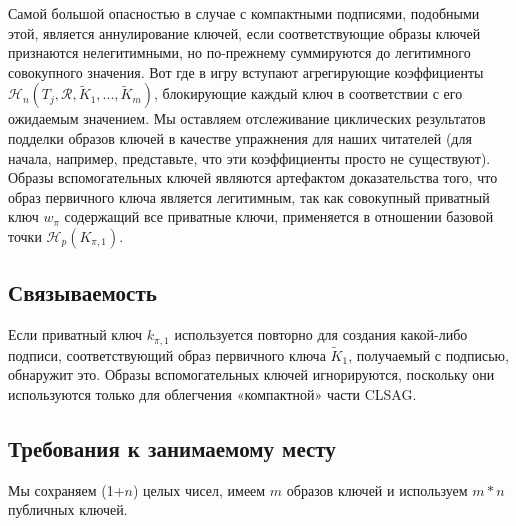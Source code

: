 Самой большой опасностью в случае с компактными подписями, подобными этой, является аннулирование ключей, если соответствующие образы ключей признаются нелегитимными, но по-прежнему суммируются до легитимного совокупного значения. Вот где в игру вступают агрегирующие коэффициенты $\mathcal{H}_n(T_j, \mathcal{R}, \tilde{K}_1,...,\tilde{K}_{m})$, блокирующие каждый ключ в соответ\-ствии с его ожидаемым значением. Мы оставляем отслеживание циклических результатов подделки образов ключей в качестве упражнения для наших читателей (для начала, например, представьте, что эти коэффициенты просто не существуют). Образы вспомогательных ключей являются артефактом доказательства того, что образ первичного ключа является легитим\-ным, так как совокупный приватный ключ $w_{\pi}$ содержащий все приватные ключи, применяется в отношении базовой точки $\mathcal{H}_p(K_{\pi,1})$.


\subsection*{Связываемость}

Если приватный ключ \(k_{\pi, 1}\) используется повторно для создания какой-либо подписи, соответ\-ствующий образ первичного ключа \(\tilde{K}_1\), получаемый с подписью, обнаружит это. Образы вспомогательных ключей игнорируются, поскольку они используются только для облегчения «компактной» части CLSAG.


\subsection*{Требования к занимаемому месту}

Мы сохраняем (1+$n$) целых чисел, имеем $m$ образов ключей и используем $m*n$ публичных ключей.

